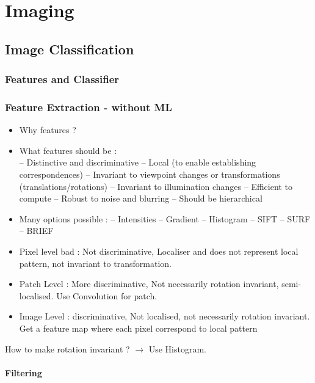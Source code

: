 \chapter{Imaging} %
\label{cha:imaging}

\section{Image Classification}

	\subsection{Features and Classifier}

	\subsection{Feature Extraction - without ML}

	\begin{itemize}
	 	\item Why features ?
	 	\item What features should be : \\
	 		– Distinctive and discriminative
			– Local (to enable establishing correspondences)
			– Invariant to viewpoint changes or transformations (translations/rotations)
			– Invariant to illumination changes
			– Efficient to compute
			– Robust to noise and blurring
			– Should be hierarchical

		\item Many options possible : – Intensities
									– Gradient
									– Histogram
									– SIFT
									– SURF
									– BRIEF
		\item Pixel level bad : Not discriminative, Localiser and does not represent local pattern, not invariant to transformation. 
		\item Patch Level : More discriminative, Not necessarily rotation invariant, semi-localised. Use Convolution for patch. 
		\item Image Level : discriminative, Not localised, not necessarily rotation invariant. Get a feature map where each pixel correspond to local pattern
	 \end{itemize} 

	 How to make rotation invariant ? $ \rightarrow $ Use Histogram.
	 \subsubsection{Filtering}

